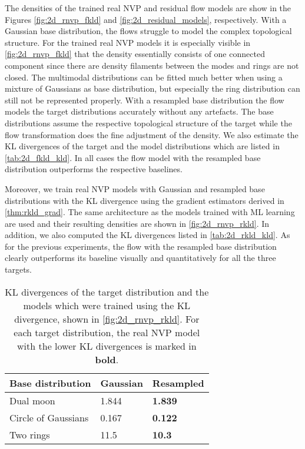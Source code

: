 \documentclass[twoside]{article}
\begin{document}
The densities of the trained real NVP and residual flow models are show in the Figures \ref{fig:2d_rnvp_fkld} and \ref{fig:2d_residual_models}, respectively. With a Gaussian base distribution, the flows struggle to model the complex topological structure. For the trained real NVP models it is especially visible in \autoref{fig:2d_rnvp_fkld} that the density essentially consists of one connected component since there are density filaments between the modes and rings are not closed. The multimodal distributions can be fitted much better when using a mixture of Gaussians as base distribution, but especially the ring distribution can still not be represented properly. With a resampled base distribution the flow models the target distributions accurately without any artefacts. The base distributions assume the respective topological structure of the target while the flow transformation does the fine adjustment of the density. We also estimate the KL divergences of the target and the model distributions which are listed in \autoref{tab:2d_fkld_kld}. In all cases the flow model with the resampled base distribution outperforms the respective baselines.

Moreover, we train real NVP models with Gaussian and resampled base distributions with the KL divergence using the gradient estimators derived in \autoref{thm:rkld_grad}. The same architecture as the models trained with ML learning are used and their resulting densities are shown in \autoref{fig:2d_rnvp_rkld}. In addition, we also computed the KL divergences listed in \autoref{tab:2d_rkld_kld}. As for the previous experiments, the flow with the resampled base distribution clearly outperforms its baseline visually and quantitatively for all the three targets.

\begin{table}[h]
  \caption{KL divergences of the target distribution and the models which were trained using the KL divergence, shown in 
  \autoref{fig:2d_rnvp_rkld}. For each target distribution, the real NVP model with the lower KL divergences is marked in \textbf{bold}.}
  \label{tab:2d_rkld_kld}
  \centering
  \vspace{0.3cm}
  \begin{tabular}{l|ll}
    Base distribution & Gaussian & Resampled \\
    \hline
    Dual moon & 1.844 & \textbf{1.839} \\
    Circle of Gaussians & 0.167 & \textbf{0.122} \\
    Two rings & 11.5 & \textbf{10.3} 
  \end{tabular}
\end{table}
\end{document}
